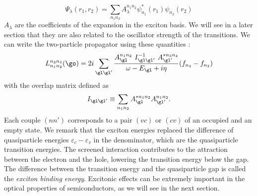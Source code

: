 \begin{equation}
	\Psi_\lambda(r_1, r_2) = \sum_{n_1 n_2} A_\lambda^{n_1n_2} \psi_{n_1}^* (r_1) \psi_{n_2} (r_2)
\end{equation}
$A_\lambda$ are the coefficients of the expansion in the exciton basis. We will see in a later section that they are also related to the oscillator strength of the transitions. We can write the two-particle propagator using these quantities :
\begin{equation}
	L^{n_3n_4}_{n_1n_2}(\go) = 2i \sum_{\gl\gl'}\frac{A^{n_1n_2}_\gl \ I^{-1}_{\gl\gl'} \ A^{*n_3n_4}_{\gl'}}{\omega - E_\gl + i\eta} (f_{n_4} - f_{n_3})
\end{equation}
with the overlap matrix defined as 
\begin{equation}
	I_{\gl\gl'} \equiv \sum_{n_1n_2} A^{*n_1n_2}_{\gl} A^{n_1n_2}_{\gl'}.
\end{equation}
Each couple $(nn')$ corresponds to a pair $(vc)$ or $(cv)$ of an occupied and an empty state. We remark that the exciton energies replaced the difference of quasiparticle energies $\varepsilon_c - \varepsilon_v$ in the denominator, which are the quasiparticle transition energies. The screened interaction contributes to the attraction between the electron and the hole, lowering the transition energy below the gap. The difference between the transition energy and the quasiparticle gap is called the \textit{exciton binding energy}. Excitonic effects can be extremely important in the optical properties of semiconductors, as we will see in the next section.
%


